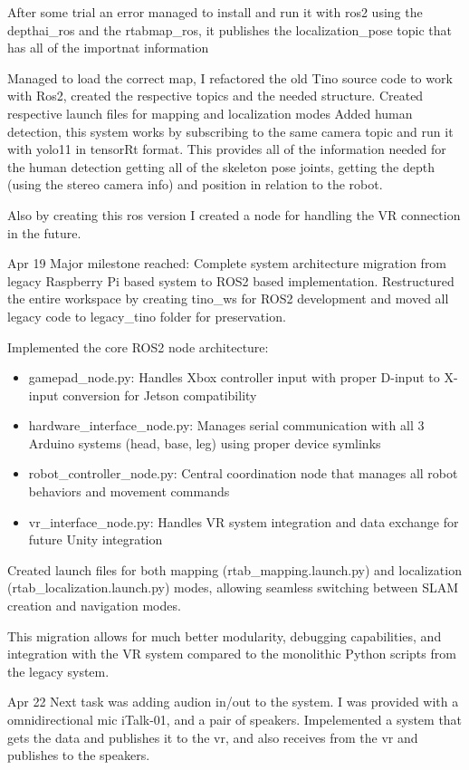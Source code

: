 After some trial an error managed to install and run it with ros2 using the depthai\_ros and the rtabmap\_ros, it publishes the localization\_pose topic that has all of the importnat information

Managed to load the correct map, I refactored the old Tino source code to work with Ros2, created the respective topics and the needed structure. Created respective launch files for mapping and localization modes
Added human detection, this system works by subscribing to the same camera topic and run it with yolo11 in tensorRt format. This provides all of the information needed for the human detection getting all of the skeleton pose joints, getting the depth (using the stereo camera info) and position in relation to the robot.

Also by creating this ros version I created a node for handling the VR connection in the future. 

Apr 19
Major milestone reached: Complete system architecture migration from legacy Raspberry Pi based system to ROS2 based implementation. Restructured the entire workspace by creating tino\_ws for ROS2 development and moved all legacy code to legacy\_tino folder for preservation.

Implemented the core ROS2 node architecture:
\begin{itemize}
\item gamepad\_node.py: Handles Xbox controller input with proper D-input to X-input conversion for Jetson compatibility
\item hardware\_interface\_node.py: Manages serial communication with all 3 Arduino systems (head, base, leg) using proper device symlinks
\item robot\_controller\_node.py: Central coordination node that manages all robot behaviors and movement commands
\item vr\_interface\_node.py: Handles VR system integration and data exchange for future Unity integration
\end{itemize}

Created launch files for both mapping (rtab\_mapping.launch.py) and localization (rtab\_localization.launch.py) modes, allowing seamless switching between SLAM creation and navigation modes.

This migration allows for much better modularity, debugging capabilities, and integration with the VR system compared to the monolithic Python scripts from the legacy system.

Apr 22
Next task was adding audion in/out to the system. I was provided with a omnidirectional mic iTalk-01, and a pair of speakers. Impelemented a system that gets the data and publishes it to the vr, and also receives from the vr and publishes to the speakers.


